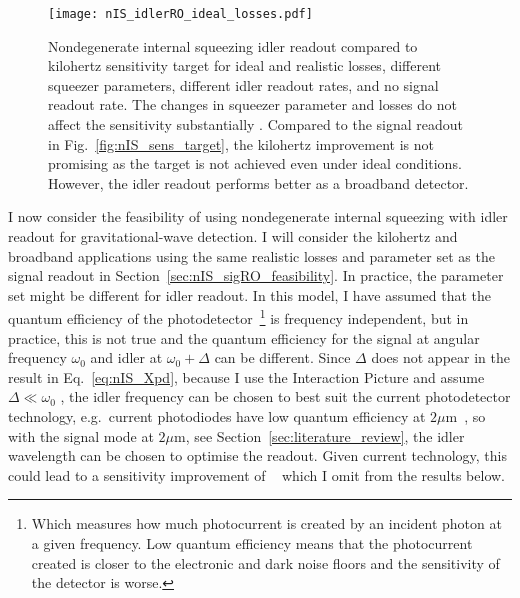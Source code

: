 \begin{figure}
	\centering
	\texttt{[image: nIS\_idlerRO\_ideal\_losses.pdf]}
	\caption{  Nondegenerate internal squeezing idler readout compared to kilohertz sensitivity target for ideal and realistic losses, different squeezer parameters, different idler readout rates, and no signal readout rate. The changes in squeezer parameter and losses do not affect the sensitivity substantially . Compared to the signal readout in Fig.~\ref{fig:nIS_sens_target}, the kilohertz improvement is not promising as the target is not achieved even under ideal conditions. However, the idler readout performs better as a broadband detector.}
	\label{fig:nIS_idlerRO_ideal_losses}
\end{figure}

I now consider the feasibility of using nondegenerate internal squeezing with idler readout for gravitational-wave detection. I will consider the kilohertz and broadband applications using the same realistic losses and parameter set as the signal readout in Section~\ref{sec:nIS_sigRO_feasibility}. 
In practice, the parameter set might be different for idler readout. In this model, I have assumed that the quantum efficiency of the photodetector~\footnote{Which measures how much photocurrent is created by an incident photon at a given frequency. Low quantum efficiency means that the photocurrent created is closer to the electronic and dark noise floors and the sensitivity of the detector is worse. } is frequency independent, but in practice, this is not true and the quantum efficiency for the signal at angular frequency $\omega_0$ and idler at $\omega_0+\Delta$ can be different. Since $\Delta$ does not appear in the result in Eq.~\ref{eq:nIS_Xpd}, because I use the Interaction Picture and assume $\Delta\ll\omega_0$ , the idler frequency can be chosen to best suit the current photodetector technology, e.g.\ current photodiodes have low quantum efficiency at $2 \mu\text{m}$~\cite{}, so with the signal mode at $2 \mu\text{m}$, see Section~\ref{sec:literature_review}, the idler wavelength can be chosen to optimise the readout. Given current technology, this could lead to a sensitivity improvement of ~\cite{} which I omit from the results below.

